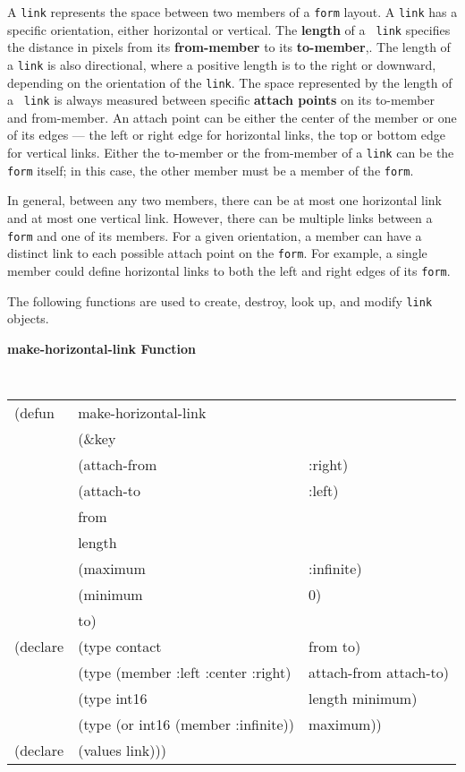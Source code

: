  


A {\tt link} represents the space between two members of a {\tt form} layout.  A
{\tt link} has a specific orientation, either horizontal or vertical.
The {\bf length} of a {\tt
link} specifies the distance in pixels from its {\bf
from-member} to its {\bf to-member},. The length of a {\tt link} is also directional, where a
positive length is to the right or downward, depending on the
orientation of the {\tt link}.  The space represented by the length of a {\tt
link} is always measured between specific {\bf attach points} on its to-member and from-member.  An attach point can be either the center
of the member or one of its edges --- the left or right edge for horizontal links,
the top or bottom edge for vertical links.
Either the to-member or the from-member of a {\tt link} can be the {\tt form}
itself; in this case, the other member must be a member of the {\tt form}.

In general, between any two members, there can be at most one horizontal
link and at most one vertical link.  However, there can be multiple
links between a {\tt form} and one of its members.  For a given
orientation, a member can have a distinct link to each possible attach
point on the {\tt form}.  For example, a single member could define
horizontal links to both the left and right edges of its {\tt form}.

The following functions are used to create, destroy, look up, and modify {\tt link}
objects.

\pagebreak

{\samepage
{\large {\bf make-horizontal-link \hfill Function}} 
\begin{flushright} 
\parbox[t]{6.125in}{
\tt
\begin{tabular}{lll}
\raggedright
(defun & make-horizontal-link & \\
&	  (\&key \\
&	   (attach-from & :right) \\
&	   (attach-to   & :left) \\
&	   from \\
&	   length      &  \\
&	   (maximum     & :infinite) \\
&	   (minimum     & 0) \\
&	   to) \\
(declare & (type contact &                        from to)\\
&	    (type (member :left :center :right) & attach-from attach-to) \\
&	    (type int16	&			 length minimum) \\
&	    (type (or int16 (member :infinite))	& maximum)) \\
(declare &(values link)))
\end{tabular}
\rm

}\end{flushright}}

